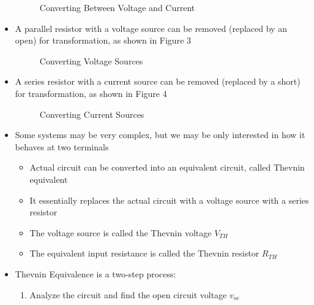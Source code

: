 \begin{itemize}
    \begin{figure}[H]
      \centering
      
      \caption{Converting Between Voltage and Current}
      \label{fig:2}
    \end{figure}

  \item A parallel resistor with a voltage source can be removed (replaced by an open) for transformation, as shown in Figure 3

    \begin{figure}[H]
      \centering
      
      \caption{Converting Voltage Sources}
      \label{fig:3}
    \end{figure}

  \item A series resistor with a current source can be removed (replaced by a short) for transformation, as shown in Figure 4

    \begin{figure}[H]
      \centering
      
      \caption{Converting Current Sources}
      \label{fig:4}
    \end{figure}

  \item Some systems may be very complex, but we may be only interested in how it behaves at two terminals

    \begin{itemize}

      \item Actual circuit can be converted into an equivalent circuit, called Thevnin equivalent

      \item It essentially replaces the actual circuit with a voltage source with a series resistor

      \item The voltage source is called the Thevnin voltage $V_{TH}$

      \item The equivalent input resistance is called the Thevnin resistor $R_{TH}$

    \end{itemize}

  \item Thevnin Equivalence is a two-step process:

    \begin{enumerate}

      \item Analyze the circuit and find the open circuit voltage $v_{oc}$


\end{enumerate}
\end{itemize}
